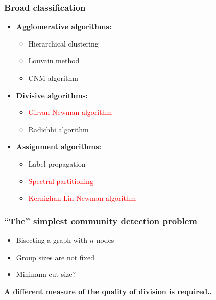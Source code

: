 \documentclass{beamer}
\begin{document}
\begin{frame}
    \frametitle{Broad classification}
    \centering
    \begin{itemize}
        \setlength\itemsep{0.5em}
        \item{{\bf Agglomerative algorithms:}
            
    \begin{itemize}
        \setlength\itemsep{0.5em}
        \item{Hierarchical clustering}
        \item{Louvain method}
        \item{CNM algorithm}
    \end{itemize}
            
            }
        \item{{\bf Divisive algorithms:}
            
    \begin{itemize}
        \setlength\itemsep{0.5em}
        \item{\textcolor{red}{Girvan-Newman algorithm}}
        \item{Radichhi algorithm}
    \end{itemize}
            
            
            }
        \item{{\bf Assignment algorithms:}

    \begin{itemize}
        \setlength\itemsep{1em}
        \item{Label propagation}
        \item{\textcolor{red}{Spectral partitioning}}
        \item{\textcolor{red}{Kernighan-Lin-Newman algorithm}}
    \end{itemize}

            }
    \end{itemize}
\end{frame}
\begin{frame}
    \frametitle{``The'' simplest community detection problem}
    \centering
    \begin{itemize}
    \setlength\itemsep{1em}
        \item{Bisecting a graph with $n$ nodes}
        \item{Group sizes are not fixed}
        \item{Minimum cut size?}
    \end{itemize}

    \vspace{2em}
    \pause
    {\bf A different measure of the quality of division is required..}
\end{frame}
\end{document}
